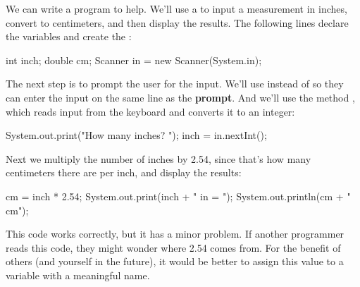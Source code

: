 
We can write a program to help.
We'll use a  to input a measurement in inches, convert to centimeters, and then display the results.
The following lines declare the variables and create the :

\begin{code}
int inch;
double cm;
Scanner in = new Scanner(System.in);
\end{code}


The next step is to prompt the user for the input.
We'll use  instead of  so they can enter the input on the same line as the {\bf prompt}.
And we'll use the  method , which reads input from the keyboard and converts it to an integer:

\begin{code}
System.out.print("How many inches? ");
inch = in.nextInt();
\end{code}

Next we multiply the number of inches by 2.54, since that's how many centimeters there are per inch, and display the results:

\begin{code}
cm = inch * 2.54;
System.out.print(inch + " in = ");
System.out.println(cm + " cm");
\end{code}

This code works correctly, but it has a minor problem.
If another programmer reads this code, they might wonder where 2.54 comes from.
For the benefit of others (and yourself in the future), it would be better to assign this value to a variable with a meaningful name.



